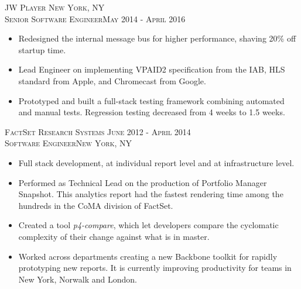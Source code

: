 \documentclass[oneside, final]{scrartcl}
\begin{document}
\begin{center}
\textsc{JW Player \hfill New York, NY\\}
\textsc{Senior Software Engineer\hfill May 2014 - April 2016\\}
\begin{itemize}
    \vspace{-8pt}
	\setlength{\itemsep}{1pt}
	\setlength{\itemsep}{1pt}
	\setlength{\parskip}{0pt}
	\setlength{\parsep}{0pt}
	\setlength{\leftmargin}{-5mm}
	\item Redesigned the internal message bus for higher performance, shaving 20\% off startup time.
	\item Lead Engineer on implementing VPAID2 specification from the IAB, HLS standard from Apple, and Chromecast from Google.
	\item Prototyped and built a full-stack testing framework combining automated and manual tests. Regression testing decreased from 4 weeks to 1.5 weeks.
\end{itemize}

\textsc{FactSet Research Systems \hfill June 2012 - April 2014\\}
\textsc{Software Engineer\hfill New York, NY\\}
\begin{itemize}
    \vspace{-8pt}
	\setlength{\itemsep}{1pt}
	\setlength{\parskip}{0pt}
	\setlength{\parsep}{0pt}
	\setlength{\leftmargin}{-5mm}
	\item Full stack development, at individual report level and at infrastructure level.
	\item Performed as Technical Lead on the production of Portfolio Manager Snapshot. This analytics report had the fastest rendering time among the hundreds in the CoMA division of FactSet.
	\item Created a tool \textit{p4-compare}, which let developers compare the cyclomatic complexity of their change against what is in master.
	\item Worked across departments creating a new Backbone toolkit for rapidly prototyping new reports. It is currently improving productivity for teams in New York, Norwalk and London.
\end{itemize}


\end{center}
\end{document}
